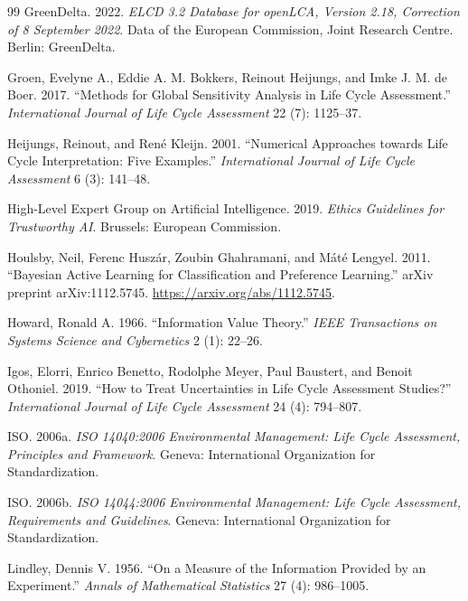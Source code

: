 \begin{thebibliography}{99}
GreenDelta. 2022. \emph{ELCD 3.2 Database for openLCA, Version 2.18, Correction of 8 September 2022}. Data of the European Commission, Joint Research Centre. Berlin: GreenDelta.

Groen, Evelyne A., Eddie A. M. Bokkers, Reinout Heijungs, and Imke J. M. de Boer. 2017. ``Methods for Global Sensitivity Analysis in Life Cycle Assessment.'' \emph{International Journal of Life Cycle Assessment} 22 (7): 1125--37.

Heijungs, Reinout, and Ren\'e Kleijn. 2001. ``Numerical Approaches towards Life Cycle Interpretation: Five Examples.'' \emph{International Journal of Life Cycle Assessment} 6 (3): 141--48.

High-Level Expert Group on Artificial Intelligence. 2019. \emph{Ethics Guidelines for Trustworthy AI}. Brussels: European Commission.

Houlsby, Neil, Ferenc Husz\'ar, Zoubin Ghahramani, and M\'at\'e Lengyel. 2011. ``Bayesian Active Learning for Classification and Preference Learning.'' arXiv preprint arXiv:1112.5745. \url{https://arxiv.org/abs/1112.5745}.

Howard, Ronald A. 1966. ``Information Value Theory.'' \emph{IEEE Transactions on Systems Science and Cybernetics} 2 (1): 22--26.

Igos, Elorri, Enrico Benetto, Rodolphe Meyer, Paul Baustert, and Benoit Othoniel. 2019. ``How to Treat Uncertainties in Life Cycle Assessment Studies?'' \emph{International Journal of Life Cycle Assessment} 24 (4): 794--807.

ISO. 2006a. \emph{ISO 14040:2006 Environmental Management: Life Cycle Assessment, Principles and Framework}. Geneva: International Organization for Standardization.

ISO. 2006b. \emph{ISO 14044:2006 Environmental Management: Life Cycle Assessment, Requirements and Guidelines}. Geneva: International Organization for Standardization.

Lindley, Dennis V. 1956. ``On a Measure of the Information Provided by an Experiment.'' \emph{Annals of Mathematical Statistics} 27 (4): 986--1005.


\end{thebibliography}
